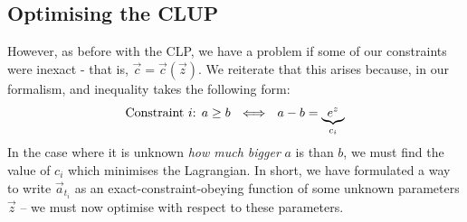 \documentclass[]{article}
\def\ai{\vec{a}_{t_i}}
\begin{document}
			
		\subsection{Optimising the CLUP}
			
			However, as before with the CLP, we have a problem if some of our constraints were inexact - that is, $\vec{c} = \vec{c}(\vec{z})$. We reiterate that this arises because, in our formalism, and inequality takes the following form:
			\begin{equation}
				\text{Constraint $i$: } a \geq b ~~\Longleftrightarrow~~ a - b = \underbrace{e^z}_{c_i}
			\end{equation}
			In the case where it is unknown \textit{how much bigger} $a$ is than $b$, we must find the value of $c_i$ which minimises the Lagrangian. In short, we have formulated a way to write $\ai$ as an exact-constraint-obeying function of some unknown parameters $\vec{z}$ -- we must now optimise with respect to these parameters. 
\end{document}
